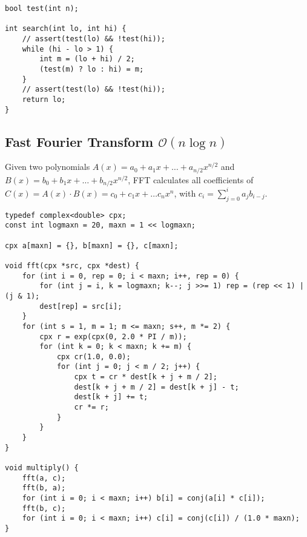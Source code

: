 \documentclass[8pt,a4paper,landscape,oneside]{amsart}
\begin{document}
\begin{multicols*}{3}
\begin{lstlisting}
bool test(int n);

int search(int lo, int hi) {
	// assert(test(lo) && !test(hi));
	while (hi - lo > 1) {
		int m = (lo + hi) / 2;
		(test(m) ? lo : hi) = m;
	}
	// assert(test(lo) && !test(hi));
	return lo;
}
\end{lstlisting}

\begin{comment}
\end{minipage}\hfill
\begin{minipage}{.45\textwidth}
	\begin{lstlisting}[title={Inclusive, Inclusive}]
bool test(int n);
	
int lo = 0, hi = n - 1;
// assert(test(lo) && !test(hi + 1));
while (lo < hi) {
	int mid = (lo + hi + 1) / 2;
	if (test(mid)) lo = mid;
	else hi = mid - 1;
}
return lo;
	\end{lstlisting}
\end{minipage}
\end{comment}

\subsection{Fast Fourier Transform $\mathcal{O}(n \log n)$}

Given two polynomials $A(x) = a_0 + a_1 x + \dots + a_{n/2} x^{n/2}$ and $B(x) = b_0 + b_1 x + \dots + b_{n/2} x^{n/2}$, FFT calculates all coefficients of $C(x) = A(x) \cdot B(x) = c_0 + c_1 x + \dots c_{n} x^{n}$, with $c_i = \sum_{j=0}^{i} a_j b_{i-j}$.

\begin{lstlisting}
typedef complex<double> cpx;
const int logmaxn = 20, maxn = 1 << logmaxn;

cpx a[maxn] = {}, b[maxn] = {}, c[maxn];

void fft(cpx *src, cpx *dest) {
	for (int i = 0, rep = 0; i < maxn; i++, rep = 0) {
		for (int j = i, k = logmaxn; k--; j >>= 1) rep = (rep << 1) | (j & 1);
		dest[rep] = src[i];
	}
	for (int s = 1, m = 1; m <= maxn; s++, m *= 2) {
		cpx r = exp(cpx(0, 2.0 * PI / m));
		for (int k = 0; k < maxn; k += m) {
			cpx cr(1.0, 0.0);
			for (int j = 0; j < m / 2; j++) {
				cpx t = cr * dest[k + j + m / 2];
				dest[k + j + m / 2] = dest[k + j] - t;
				dest[k + j] += t;
				cr *= r;
			}
		}
	}
}

void multiply() {
	fft(a, c);
	fft(b, a);
	for (int i = 0; i < maxn; i++) b[i] = conj(a[i] * c[i]);
	fft(b, c);
	for (int i = 0; i < maxn; i++) c[i] = conj(c[i]) / (1.0 * maxn);
}
\end{lstlisting}


\end{multicols*}
\end{document}
